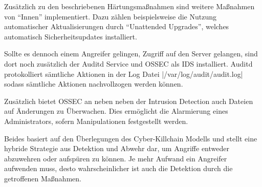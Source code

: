 Zusätzlich zu den beschriebenen Härtungsmaßnahmen sind weitere Maßnahmen von \enquote{Innen} implementiert. Dazu zählen beispielsweise die Nutzung automatischer Aktualisierungen durch \enquote{Unattended Upgrades}, welches automatisch Sicherheitsupdates installiert.

Sollte es dennoch einem Angreifer gelingen, Zugriff auf den Server gelangen, sind dort noch zusätzlich der Auditd Service und OSSEC als \ac{IDS} installiert. Auditd protokolliert sämtliche Aktionen in der Log Datei |/var/log/audit/audit.log| sodass sämtliche Aktionen nachvollzogen werden können.

Zusätzlich bietet OSSEC an neben neben der Intrusion Detection auch Dateien auf Änderungen zu Überwachen. Dies ermöglicht die Alarmierung eines Administrators, sofern Manipulationen festgestellt werden.


Beides basiert auf den Überlegungen des Cyber-Killchain Modells und stellt eine hybride Strategie aus Detektion und Abwehr dar, um Angriffe entweder abzuwehren oder aufspüren zu können. Je mehr Aufwand ein Angreifer aufwenden muss, desto wahrscheinlicher ist auch die Detektion durch die getroffenen Maßnahmen.
